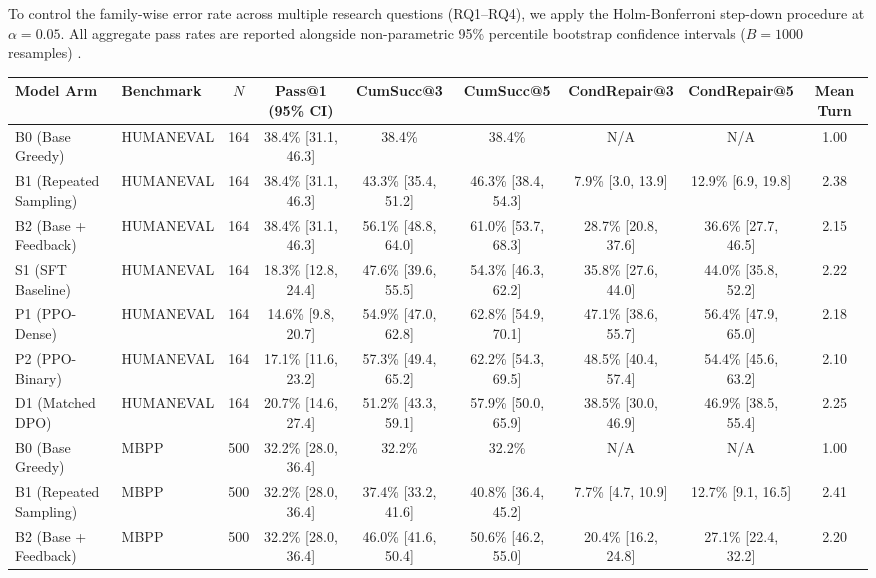\documentclass[letterpaper]{article} %
\begin{document}
To control the family-wise error rate across multiple research questions (RQ1--RQ4), we apply the Holm-Bonferroni step-down procedure \citep{holm1979} at $\alpha = 0.05$. All aggregate pass rates are reported alongside non-parametric 95\% percentile bootstrap confidence intervals ($B = 1000$ resamples) \citep{efron1993bootstrap}.

\begin{table}[t]
\centering
\small
\setlength{\tabcolsep}{3.5pt}
\begin{tabular}{llccccccc}
\toprule
\textbf{Model Arm} & \textbf{Benchmark} & \textbf{$N$} & \textbf{Pass@1 (95\% CI)} & \textbf{CumSucc@3} & \textbf{CumSucc@5} & \textbf{CondRepair@3} & \textbf{CondRepair@5} & \textbf{Mean Turn} \\
\midrule
B0 (Base Greedy) & HUMANEVAL & 164 & 38.4\% [31.1, 46.3] & 38.4\% & 38.4\% & N/A & N/A & 1.00 \\
B1 (Repeated Sampling) & HUMANEVAL & 164 & 38.4\% [31.1, 46.3] & 43.3\% [35.4, 51.2] & 46.3\% [38.4, 54.3] & 7.9\% [3.0, 13.9] & 12.9\% [6.9, 19.8] & 2.38 \\
B2 (Base + Feedback) & HUMANEVAL & 164 & 38.4\% [31.1, 46.3] & 56.1\% [48.8, 64.0] & 61.0\% [53.7, 68.3] & 28.7\% [20.8, 37.6] & 36.6\% [27.7, 46.5] & 2.15 \\
S1 (SFT Baseline) & HUMANEVAL & 164 & 18.3\% [12.8, 24.4] & 47.6\% [39.6, 55.5] & 54.3\% [46.3, 62.2] & 35.8\% [27.6, 44.0] & 44.0\% [35.8, 52.2] & 2.22 \\
P1 (PPO-Dense) & HUMANEVAL & 164 & 14.6\% [9.8, 20.7] & 54.9\% [47.0, 62.8] & 62.8\% [54.9, 70.1] & 47.1\% [38.6, 55.7] & 56.4\% [47.9, 65.0] & 2.18 \\
P2 (PPO-Binary) & HUMANEVAL & 164 & 17.1\% [11.6, 23.2] & 57.3\% [49.4, 65.2] & 62.2\% [54.3, 69.5] & 48.5\% [40.4, 57.4] & 54.4\% [45.6, 63.2] & 2.10 \\
D1 (Matched DPO) & HUMANEVAL & 164 & 20.7\% [14.6, 27.4] & 51.2\% [43.3, 59.1] & 57.9\% [50.0, 65.9] & 38.5\% [30.0, 46.9] & 46.9\% [38.5, 55.4] & 2.25 \\
\midrule
B0 (Base Greedy) & MBPP & 500 & 32.2\% [28.0, 36.4] & 32.2\% & 32.2\% & N/A & N/A & 1.00 \\
B1 (Repeated Sampling) & MBPP & 500 & 32.2\% [28.0, 36.4] & 37.4\% [33.2, 41.6] & 40.8\% [36.4, 45.2] & 7.7\% [4.7, 10.9] & 12.7\% [9.1, 16.5] & 2.41 \\
B2 (Base + Feedback) & MBPP & 500 & 32.2\% [28.0, 36.4] & 46.0\% [41.6, 50.4] & 50.6\% [46.2, 55.0] & 20.4\% [16.2, 24.8] & 27.1\% [22.4, 32.2] & 2.20 \\

\end{tabular}
\end{table}
\end{document}
